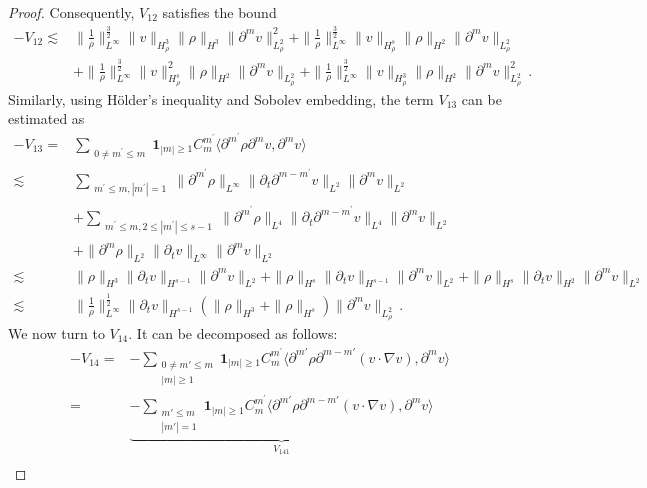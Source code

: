 \documentclass[reqno,11pt]{amsart}
\numberwithin{equation}{section}
\def\p{\partial}
\def\no{\nonumber}
\begin{document}
\begin{proof}
Consequently, $V_{12}$ satisfies the bound
\begin{equation}\label{v-eq120}
	\begin{aligned}
-V_{12} \lesssim & \|\frac{1}{\rho}\|^{\frac{3}{2}}_{L^\infty}\|v\|_{H^3_\rho}\|\rho\|_{H^3}\|\p^mv\|^2_{L^2_\rho}+ \|\frac{1}{\rho}\|^{\frac{3}{2}}_{L^\infty}\|v\|_{H^s_\rho}\|\rho\|_{H^2}\|\p^mv\|_{L^2_\rho}\\
& + \|\frac{1}{\rho}\|^{\frac{3}{2}}_{L^\infty}\|v\|^2_{H^s_\rho}\|\rho\|_{H^2}\|\p^mv\|_{L^2_\rho}+ \|\frac{1}{\rho}\|^{\frac{3}{2}}_{L^\infty}\|v\|_{H^3_\rho}\|\rho\|_{H^2}\|\p^mv\|^2_{L^2_\rho}
\,.
	\end{aligned}
\end{equation}
Similarly, using H\"older's inequality and Sobolev embedding, the term $V_{13}$ can be estimated as
\begin{equation}\label{v-eq13}
	\begin{aligned}
-V_{13}= & \sum_{\substack{ 0\neq m^{\prime}\leq m}}\mathbf{1}_{|m|\geq 1} C^{m^{\prime}}_{m} \langle \p^{m^{\prime}} \rho\partial^{m} v  ,\partial^{m} v \rangle\\
\lesssim & \sum_{\substack{ m^{\prime}\leq m,|m^{\prime}|=1}}\|\p^{m^{\prime}}\rho\|_{L^{\infty}}\|\p_t\p^{m-m^{\prime}}v\|_{L^2}\|\p^mv\|_{L^2} \\
& +\sum_{\substack{ m^{\prime}\leq m,2\leq|m^{\prime}|\leq s-1}}\|\p^{m^{\prime}}\rho\|_{L^4}\|\p_t\p^{m-m^{\prime}}v\|_{L^4}\|\p^mv\|_{L^2}\\
& +\|\p^m\rho\|_{L^2}\|\p_t v\|_{L^\infty}\|\p^m v\|_{L^2}\\
\lesssim & \| \rho \|_{H^3} \| \partial_t v \|_{H^{s-1}} \| \partial^m v \|_{L^2} + \| \rho\|_{H^s} \| \partial_t v \|_{H^{s-1}} \| \partial^m v \|_{L^2} + \| \rho \|_{H^s} \| \partial_t v \|_{H^2} \| \partial^m v \|_{L^2} \\
\lesssim & \| \frac{1}{\rho} \|_{L^\infty}^{\frac{1}{2}} \| \partial_t v \|_{H^{s-1}} \left( \| \rho \|_{H^3} + \| \rho\|_{H^s} \right) \| \partial^m v \|_{L^2_\rho} \,.
	\end{aligned}
\end{equation}
We now turn to $V_{14}$. It can be decomposed as follows:
	\begin{align}\label{v-eq14}
\no -V_{14} = & -\sum_{\substack{0\neq m'\leq m \\ |m|\geq 1}} \mathbf{1}_{|m|\geq 1}C_m^{m^{\prime}}\langle \partial^{m'} \rho \partial^{m - m'} (v \cdot \nabla v), \partial^m v \rangle \\
= & \underset{V_{141}}{\underbrace{ -\sum_{\substack{m'\leq m \\ |m'|=1 }}\mathbf{1}_{|m|\geq 1}C_m^{m^{\prime}}\langle \partial^{m'} \rho \partial^{m - m'} (v \cdot \nabla v), \partial^m v \rangle}} \\

\end{align}
\end{proof}
\end{document}

